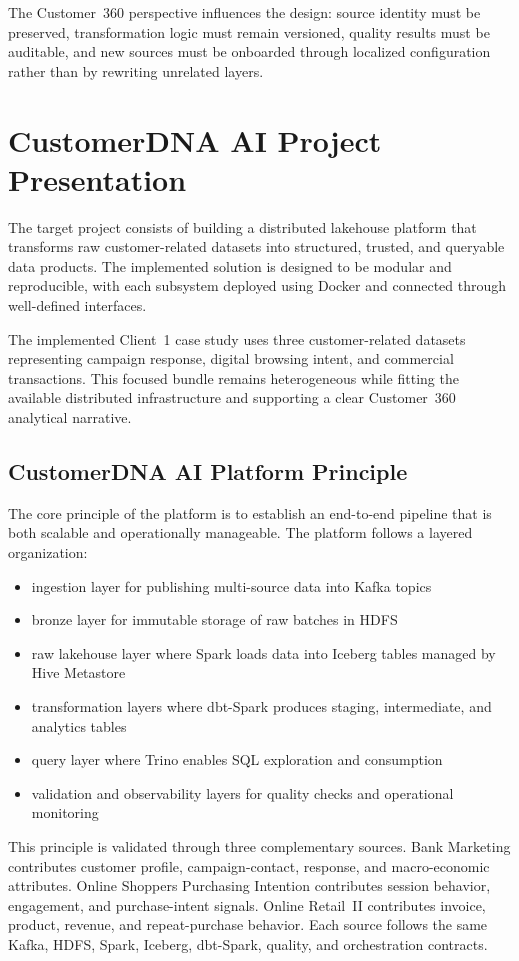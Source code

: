 The Customer~360 perspective influences the design: source identity must be preserved, transformation logic must remain versioned, quality results must be auditable, and new sources must be onboarded through localized configuration rather than by rewriting unrelated layers.

\section{CustomerDNA AI Project Presentation}
The target project consists of building a distributed lakehouse platform that transforms raw customer-related datasets into structured, trusted, and queryable data products. The implemented solution is designed to be modular and reproducible, with each subsystem deployed using Docker and connected through well-defined interfaces.

The implemented Client~1 case study uses three customer-related datasets representing campaign response, digital browsing intent, and commercial transactions. This focused bundle remains heterogeneous while fitting the available distributed infrastructure and supporting a clear Customer~360 analytical narrative.

\subsection{CustomerDNA AI Platform Principle}
The core principle of the platform is to establish an end-to-end pipeline that is both scalable and operationally manageable. The platform follows a layered organization:
\begin{itemize}
    \item ingestion layer for publishing multi-source data into Kafka topics
    \item bronze layer for immutable storage of raw batches in HDFS
    \item raw lakehouse layer where Spark loads data into Iceberg tables managed by Hive Metastore
    \item transformation layers where dbt-Spark produces staging, intermediate, and analytics tables
    \item query layer where Trino enables SQL exploration and consumption
    \item validation and observability layers for quality checks and operational monitoring
\end{itemize}

This principle is validated through three complementary sources. Bank Marketing contributes customer profile, campaign-contact, response, and macro-economic attributes. Online Shoppers Purchasing Intention contributes session behavior, engagement, and purchase-intent signals. Online Retail~II contributes invoice, product, revenue, and repeat-purchase behavior. Each source follows the same Kafka, HDFS, Spark, Iceberg, dbt-Spark, quality, and orchestration contracts.

